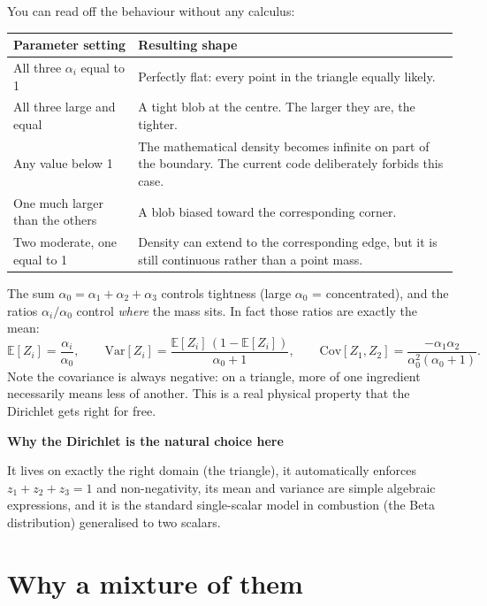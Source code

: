 \documentclass[11pt,a4paper]{report}
\renewcommand{\_}{\origtextunderscore\allowbreak}
\newlength{\calloutwidth}
\newcommand{\calloutOpen}{%
  \par\medskip\noindent
  \setlength{\calloutwidth}{\dimexpr\linewidth-2\fboxsep\relax}%
  \begin{lrbox}{\calloutbox}\begin{minipage}{\calloutwidth}}
\newcommand{\calloutClose}[1]{%
  \end{minipage}\end{lrbox}\colorbox{#1}{\usebox{\calloutbox}}\par\medskip}
\newenvironment{plainbox}[1]
  {\calloutOpen\textbf{#1}\par\medskip}
  {\calloutClose{BoxBG}}
\begin{document}
You can read off the behaviour without any calculus:

\begin{center}
\begin{tabular}{@{}lp{9.6cm}@{}}
\toprule
\textbf{Parameter setting} & \textbf{Resulting shape} \\
\midrule
All three $\alpha_i$ equal to 1 & Perfectly flat: every point in the triangle equally likely. \\[3pt]
All three large and equal & A tight blob at the centre. The larger they are, the tighter. \\[3pt]
Any value below 1 & The mathematical density becomes infinite on part of the boundary.
                    The current code deliberately forbids this case. \\[3pt]
One much larger than the others & A blob biased toward the corresponding corner. \\[3pt]
Two moderate, one equal to 1 & Density can extend to the corresponding edge, but it is
                               still continuous rather than a point mass. \\
\bottomrule
\end{tabular}
\end{center}

The sum $\alpha_0 = \alpha_1 + \alpha_2 + \alpha_3$ controls tightness (large $\alpha_0$ =
concentrated), and the ratios $\alpha_i / \alpha_0$ control \emph{where} the mass sits. In
fact those ratios are exactly the mean:
\[
  \mathbb{E}[Z_i] = \frac{\alpha_i}{\alpha_0}, \qquad
  \mathrm{Var}[Z_i] = \frac{\mathbb{E}[Z_i]\,(1 - \mathbb{E}[Z_i])}{\alpha_0 + 1},\qquad
  \mathrm{Cov}[Z_1, Z_2] = \frac{-\alpha_1 \alpha_2}{\alpha_0^2 (\alpha_0 + 1)} .
\]
Note the covariance is always negative: on a triangle, more of one ingredient necessarily
means less of another. This is a real physical property that the Dirichlet gets right for free.

\begin{plainbox}{Why the Dirichlet is the natural choice here}
It lives on exactly the right domain (the triangle), it automatically enforces
$z_1 + z_2 + z_3 = 1$ and non-negativity, its mean and variance are simple algebraic
expressions, and it is the standard single-scalar model in combustion (the Beta distribution)
generalised to two scalars.
\end{plainbox}

\section{Why a mixture of them}
\end{document}
